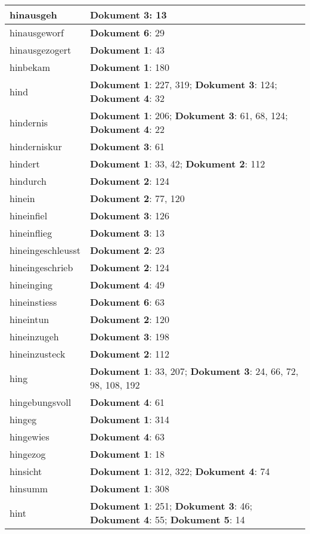 \documentclass[a5paper]{article}
\begin{document}
\begin{longtable}[l]{|l|p{3in}|}
\hline
hinausgeh & \textbf{Dokument 3}: 13 \\
\hline
hinausgeworf & \textbf{Dokument 6}: 29 \\
\hline
hinausgezogert & \textbf{Dokument 1}: 43 \\
\hline
hinbekam & \textbf{Dokument 1}: 180 \\
\hline
hind & \textbf{Dokument 1}: 227, 319; \textbf{Dokument 3}: 124; \textbf{Dokument 4}: 32 \\
\hline
hindernis & \textbf{Dokument 1}: 206; \textbf{Dokument 3}: 61, 68, 124; \textbf{Dokument 4}: 22 \\
\hline
hinderniskur & \textbf{Dokument 3}: 61 \\
\hline
hindert & \textbf{Dokument 1}: 33, 42; \textbf{Dokument 2}: 112 \\
\hline
hindurch & \textbf{Dokument 2}: 124 \\
\hline
hinein & \textbf{Dokument 2}: 77, 120 \\
\hline
hineinfiel & \textbf{Dokument 3}: 126 \\
\hline
hineinflieg & \textbf{Dokument 3}: 13 \\
\hline
hineingeschleusst & \textbf{Dokument 2}: 23 \\
\hline
hineingeschrieb & \textbf{Dokument 2}: 124 \\
\hline
hineinging & \textbf{Dokument 4}: 49 \\
\hline
hineinstiess & \textbf{Dokument 6}: 63 \\
\hline
hineintun & \textbf{Dokument 2}: 120 \\
\hline
hineinzugeh & \textbf{Dokument 3}: 198 \\
\hline
hineinzusteck & \textbf{Dokument 2}: 112 \\
\hline
hing & \textbf{Dokument 1}: 33, 207; \textbf{Dokument 3}: 24, 66, 72, 98, 108, 192 \\
\hline
hingebungsvoll & \textbf{Dokument 4}: 61 \\
\hline
hingeg & \textbf{Dokument 1}: 314 \\
\hline
hingewies & \textbf{Dokument 4}: 63 \\
\hline
hingezog & \textbf{Dokument 1}: 18 \\
\hline
hinsicht & \textbf{Dokument 1}: 312, 322; \textbf{Dokument 4}: 74 \\
\hline
hinsumm & \textbf{Dokument 1}: 308 \\
\hline
hint & \textbf{Dokument 1}: 251; \textbf{Dokument 3}: 46; \textbf{Dokument 4}: 55; \textbf{Dokument 5}: 14 \\

\end{longtable}
\end{document}
